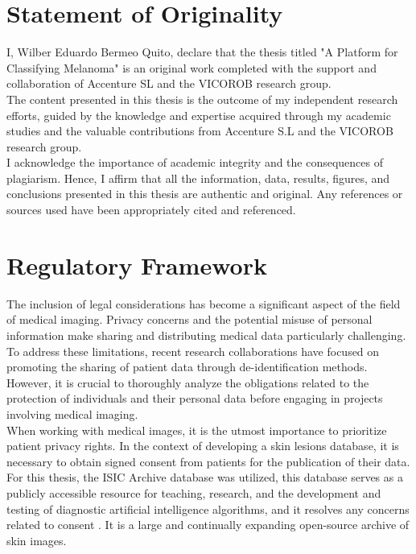 \section{Statement of Originality}

I, Wilber Eduardo Bermeo Quito, declare that the thesis titled "A Platform for
Classifying Melanoma" is an original work completed with the support and
collaboration of Accenture SL and the VICOROB research group. \\

The content presented in this thesis is the outcome of my independent research
efforts, guided by the knowledge and expertise acquired through my academic
studies and the valuable contributions from Accenture S.L and the VICOROB
research group. \\

I acknowledge the importance of academic integrity and the consequences of
plagiarism. Hence, I affirm that all the information, data, results, figures,
and conclusions presented in this thesis are authentic and original. Any
references or sources used have been appropriately cited and referenced.

\section{Regulatory Framework}

The inclusion of legal considerations has become a significant aspect of the
field of medical imaging. Privacy concerns and the potential misuse of personal
information make sharing and distributing medical data particularly
challenging. To address these limitations, recent research collaborations have
focused on promoting the sharing of patient data through de-identification
methods. However, it is crucial to thoroughly analyze the obligations related
to the protection of individuals and their personal data before engaging in
projects involving medical imaging. \\

When working with medical images, it is the utmost importance to prioritize
patient privacy rights. In the context of developing a skin lesions database,
it is necessary to obtain signed consent from patients for the publication of
their data. For this thesis, the ISIC Archive database was utilized, this
database serves as a publicly accessible resource for teaching, research, and
the development and testing of diagnostic artificial intelligence algorithms,
and it resolves any concerns related to consent \cite{IsicArchive}. It is a
large and continually expanding open-source archive of skin images.

